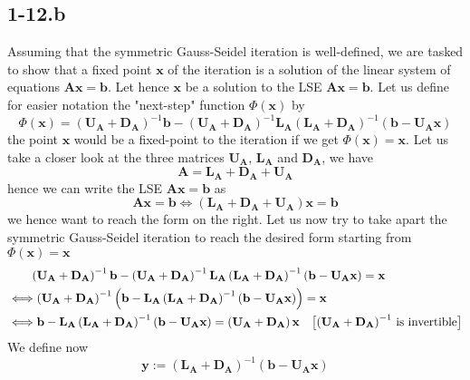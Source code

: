 \documentclass{article}
\newcommand\DA{\mathbf{D}_{\mathbf{A}}}
\newcommand\LA{\mathbf{L}_{\mathbf{A}}}
\newcommand\UA{\mathbf{U}_{\mathbf{A}}}
\begin{document}
\subsection*{1-12.b}
Assuming that the symmetric Gauss-Seidel iteration is well-defined, we are tasked to show that a fixed point $\mathbf{x}$ of the iteration is a solution of the linear system of equations $\mathbf{A}\mathbf{x} = \mathbf{b}$. Let hence $\mathbf{x}$ be a solution to the LSE $\mathbf{A}\mathbf{x} = \mathbf{b}$. Let us define for easier notation the "next-step" function $\Phi\left(\mathbf{x}\right)$ by
\begin{equation*}
    \Phi\left(\mathbf{x}\right) = \left(\UA + \DA\right)^{-1}\mathbf{b} - \left(\UA + \DA\right)^{-1}\LA\left(\LA + \DA\right)^{-1}\left(\mathbf{b}- \UA \mathbf{x}\right)
\end{equation*}
the point $\mathbf{x}$ would be a fixed-point to the iteration if we get $\Phi\left(\mathbf{x}\right) = \mathbf{x}$. Let us take a closer look at the three matrices $\UA$, $\LA$ and $\DA$, we have
\begin{equation*}
    \mathbf{A} = \LA + \DA + \UA
\end{equation*}
hence we can write the LSE $\mathbf{A}\mathbf{x} = \mathbf{b}$ as 
\begin{equation*}
    \mathbf{A}\mathbf{x} = \mathbf{b} \Longleftrightarrow \left(\LA + \DA + \UA\right)\mathbf{x} = \mathbf{b}
\end{equation*}
we hence want to reach the form on the right. Let us now try to take apart the symmetric Gauss-Seidel iteration to reach the desired form starting from $\Phi\left(\mathbf{x}\right) = \mathbf{x}$ 
\begin{align*}
   &\phantom{\Longleftrightarrow} \left(\UA + \DA\right)^{-1}\mathbf{b} - \left(\UA + \DA\right)^{-1}\LA\left(\LA + \DA\right)^{-1}\left(\mathbf{b}- \UA \mathbf{x}\right) = \mathbf{x} \\
    &\Longleftrightarrow 
    \left(\UA + \DA\right)^{-1}\left(\mathbf{b} - \LA\left(\LA + \DA\right)^{-1}\left(\mathbf{b}- \UA \mathbf{x}\right)\right) = \mathbf{x} \\
    &\Longleftrightarrow
    \mathbf{b} - \LA\left(\LA + \DA\right)^{-1}\left(\mathbf{b}- \UA \mathbf{x}\right) = \left(\UA + \DA\right)\mathbf{x} \quad \text{\big[$\left(\UA + \DA\right)^{-1}$ is invertible\big]}
\end{align*}
We define now 
\begin{equation*}
    \mathbf{y} := \left(\LA + \DA\right)^{-1}\left(\mathbf{b}- \UA \mathbf{x}\right)
\end{equation*}
\end{document}
